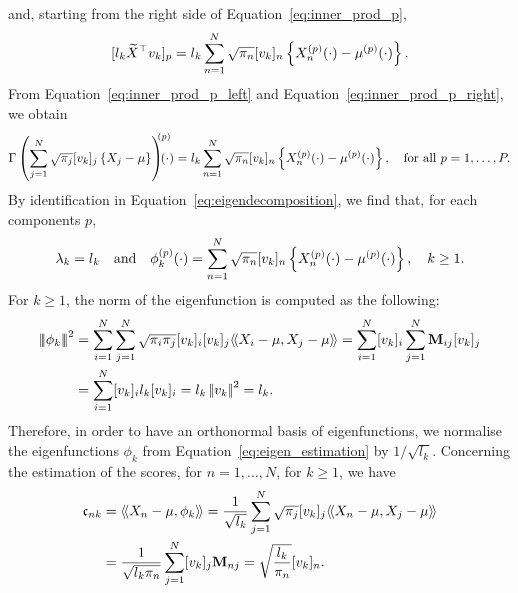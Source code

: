 and, starting from the right side of Equation~\eqref{eq:inner_prod_p},
\begin{equation}\label{eq:inner_prod_p_right}
    [l_k \widetilde{X}^\top v_k]_p = l_k \sum_{n = 1}^N \sqrt{\pi_n}[v_{k}]_n \left\{X_n^{(p)}(\cdot) - \mu^{(p)}(\cdot)\right\}.
\end{equation}
From Equation~\eqref{eq:inner_prod_p_left} and Equation~\eqref{eq:inner_prod_p_right}, we obtain
\begin{equation}
    \Gamma\left(\sum_{j = 1}^N \sqrt{\pi_j}[v_{k}]_j \left\{X_j - \mu\right\}\right)^{\mkern-9mu(p)}\mkern-18mu(\cdot) = l_k \sum_{n = 1}^N \sqrt{\pi_n}[v_{k}]_n \left\{X_n^{(p)}(\cdot) - \mu^{(p)}(\cdot)\right\}, \quad\text{for all}~ p = 1, \dots, P.
\end{equation}
By identification in Equation~\eqref{eq:eigendecomposition}, we find that, for each components $p$,
\begin{equation}\label{eq:eigen_estimation}
\lambda_k = l_k \quad\text{and}\quad \phi_k^{(p)}(\cdot) = \sum_{n = 1}^N \sqrt{\pi_n}[v_{k}]_n \left\{X_n^{(p)}(\cdot) - \mu^{(p)}(\cdot)\right\}, \quad k \geq 1.
\end{equation}
For $k \geq 1$, the norm of the eigenfunction is computed as the following:
\begin{align*}
\normH{\phi_k}^2 &= \sum_{i = 1}^N \sum_{j = 1}^N \sqrt{\pi_i\pi_j}[v_{k}]_i [v_{k}]_j\inH{X_i - \mu}{X_j - \mu} = \sum_{i = 1}^N [v_{k}]_i \sum_{j = 1}^N \mathbf{M}_{ij} [v_{k}]_j \\
    &= \sum_{i = 1}^N [v_{k}]_i l_k [v_{k}]_i = l_k \normLp{v_k}^2 = l_k. \\
\end{align*}
Therefore, in order to have an orthonormal basis of eigenfunctions, we normalise the eigenfunctions $\phi_k$ from Equation~\eqref{eq:eigen_estimation} by $1 / \sqrt{l_k}$.
Concerning the estimation of the scores, for $n = 1, \dots, N$, for $k \geq 1$, we have
\begin{align}
    \mathfrak{c}_{nk} &= \langle\!\langle X_n - \mu, \phi_k\rangle\!\rangle = \frac{1}{\sqrt{l_k}}\sum_{j = 1}^N \sqrt{\pi_j}[v_{k}]_j \langle\!\langle X_n - \mu, X_j - \mu\rangle\!\rangle\\
    &= \frac{1}{\sqrt{l_k\pi_n}}\sum_{j = 1}^N [v_{k}]_j \mathbf{M}_{nj} = \sqrt{\frac{l_k}{\pi_n}}[v_{k}]_n.\\
\end{align}

